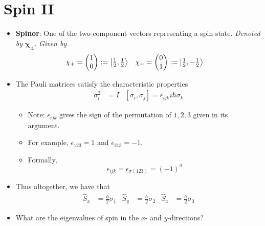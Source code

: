 \documentclass[../notes.tex]{subfiles}
\begin{document}
\section{Spin II}
\begin{itemize}
    \item {}\textbf{Spinor}: One of the two-component vectors representing a spin state. \emph{Denoted by} $\bm{\chi_\pm}$. \emph{Given by}
    \begin{align*}
        \chi_+ &=
        \begin{pmatrix}
            1\\
            0\\
        \end{pmatrix}
        := \ket{\tfrac{1}{2},\tfrac{1}{2}}&
        \chi_- &=
        \begin{pmatrix}
            0\\
            1\\
        \end{pmatrix}
        := \ket{\tfrac{1}{2},-\tfrac{1}{2}}
    \end{align*}
    \item The Pauli matrices satisfy the characteristic properties
    \begin{align*}
        \sigma_i^2 &= I&
        [\sigma_i,\sigma_j] = \epsilon_{ijk}i\hbar\sigma_k
    \end{align*}
    \begin{itemize}
        \item Note: $\epsilon_{ijk}$ gives the sign of the permutation of $1,2,3$ given in its argument.
        \item For example, $\epsilon_{123}=1$ and $\epsilon_{213}=-1$.
        \item Formally,
        \begin{equation*}
            \epsilon_{ijk} = \epsilon_{\sigma(123)}
            = (-1)^\sigma
        \end{equation*}
    \end{itemize}
    \item Thus altogether, we have that
    \begin{align*}
        \hat{S}_x &= \frac{\hbar}{2}\sigma_1&
        \hat{S}_y &= \frac{\hbar}{2}\sigma_2&
        \hat{S}_z &= \frac{\hbar}{2}\sigma_3
    \end{align*}
    \item What are the eigenvalues of spin in the $x$- and $y$-directions?
    \begin{itemize}

\end{itemize}
\end{itemize}
\end{document}
